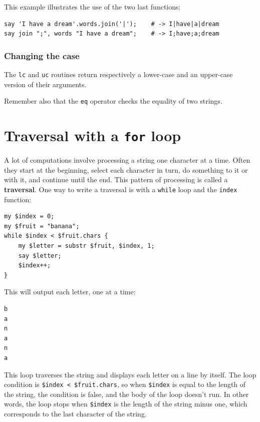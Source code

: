 This example illustrates the use of the two last functions:
\begin{verbatim}
say 'I have a dream'.words.join('|');    # -> I|have|a|dream
say join ";", words "I have a dream";    # -> I;have;a;dream
\end{verbatim}
%

\subsubsection{Changing the case}
 
The {\tt lc} and {\tt uc} routines return respectively a 
lower-case and an upper-case version of their arguments.

Remember also that the {\tt eq} operator checks the equality 
of two strings. 

\section{Traversal with a {\tt for} loop}
\label{stringtraversal}

A lot of computations involve processing a string one 
character at a time.  Often they start at the beginning, 
select each character in turn, do something to it or with 
it, and continue until the end.  This pattern of
processing is called a {\bf traversal}.  One way to write
a traversal is with a {\tt while} loop and the 
{\tt index} function:

\begin{verbatim}
my $index = 0;
my $fruit = "banana";
while $index < $fruit.chars { 
    my $letter = substr $fruit, $index, 1; 
    say $letter; 
    $index++;
}
\end{verbatim}
%

This will output each letter, one at a time:
\begin{verbatim}
b
a
n
a
n
a
\end{verbatim}
%
This loop traverses the string and displays each letter on 
a line by itself.  The loop condition is 
{\tt \$index < \$fruit.chars}, so when {\tt \$index} is equal 
to the length of the string, the condition is false, and 
the body of the loop doesn't run. In other words, the loop 
stops when {\tt \$index} is the length of the string minus 
one, which corresponds to the last character of the string.

